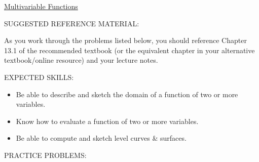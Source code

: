 \documentclass[12pt]{article}
\begin{document}
\begin{center}
\underline{\LARGE{Multivariable Functions}}
\end{center}

\noindent SUGGESTED REFERENCE MATERIAL:

\bigskip

\noindent As you work through the problems listed below, you should reference Chapter 13.1 of the recommended textbook (or the equivalent chapter in your alternative textbook/online resource) and your lecture notes.

\noindent EXPECTED SKILLS:

\begin{itemize}

\item Be able to describe and sketch the domain of a function of two or more variables.

\item Know how to evaluate a function of two or more variables.

\item Be able to compute and sketch level curves \& surfaces.

\end{itemize}

\noindent PRACTICE PROBLEMS:

\medskip
\end{document}
